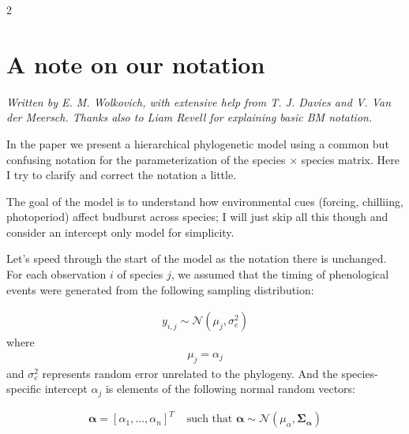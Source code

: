 \documentclass[10pt]{article}
\begin{document}

\begin{multicols}{2}

\section*{A note on our notation}

\emph{Written by E. M. Wolkovich, with extensive help from T. J. Davies and V. Van der Meersch. Thanks also to Liam Revell for explaining basic BM notation.}

In the paper \citet{morales2024phylogenetic} we present a hierarchical phylogenetic model using a common but confusing notation for the parameterization of the species $\times$ species matrix. Here I try to clarify and correct the notation a little. 

The goal of the model is to understand how environmental cues (forcing, chilliing, photoperiod) affect budburst across species; I will just skip all this though and consider an intercept only model for simplicity. 

Let's speed through the start of the model as the notation there is unchanged. For each observation $i$ of species $j$, we assumed that the timing of phenological events were generated from the following sampling distribution:

\begin{align*}
  \label{modely}
  y_{i,j} \sim \mathcal{N}(\mu_j, \sigma_e^2)
\end{align*}
where
\begin{align*}
  \label{modelmu}
  \mu_j = \alpha_j 
  \end{align*}
and $\sigma_e^2$ represents random error unrelated to the phylogeny. And the species-specific intercept $\alpha_j$ is elements of the following normal random vectors:

\begin{align*}
    \label{phybetas}
  \boldsymbol{\alpha} = [\alpha_1, \ldots, \alpha_n]^T & \text{ such that }
  \boldsymbol{\alpha} \sim \mathcal{N}(\mu_{\alpha},\boldsymbol{\Sigma_{\alpha}}) 
\end{align*}


\end{multicols}
\end{document}
